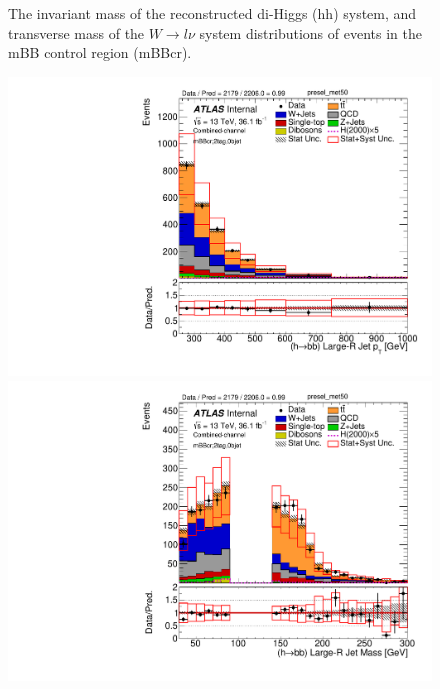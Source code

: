 \begin{figure}[!h]
\begin{center}
\caption{The invariant mass of the reconstructed di-Higgs (hh) system, \met and transverse mass of the $W \to l\nu$ system
distributions of events in the mBB control region (mBBcr).}
\label{fig:boosted_mbbcr_mainplots}
\end{center}
\end{figure}
\newpage
% 
\begin{figure}[!h]
\begin{center}
\includegraphics[scale=0.33]{./figures/boosted/PlotsInMbbCR/DataMC_2tag_0bjet_mbbcr_lepton_presel_met50_HbbPt}
\includegraphics[scale=0.33]{./figures/boosted/PlotsInMbbCR/DataMC_2tag_0bjet_mbbcr_lepton_presel_met50_HbbMass} \\
\par\medskip

\end{center}
\end{figure}
